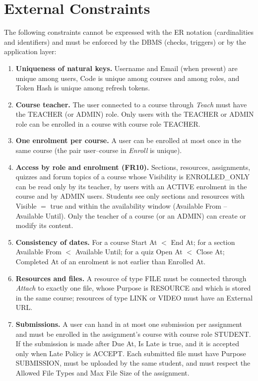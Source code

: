 \section{External Constraints}
The following constraints cannot be expressed with the ER notation (cardinalities and identifiers) and must be enforced by the DBMS (checks, triggers) or by the application layer:
\begin{enumerate}
    \item \textbf{Uniqueness of natural keys.} Username and Email (when present) are unique among users, Code is unique among courses and among roles, and Token Hash is unique among refresh tokens.

    \item \textbf{Course teacher.} The user connected to a course through \textit{Teach} must have the TEACHER (or ADMIN) role. Only users with the TEACHER or ADMIN role can be enrolled in a course with course role TEACHER.

    \item \textbf{One enrolment per course.} A user can be enrolled at most once in the same course (the pair user--course in \textit{Enroll} is unique).

    \item \textbf{Access by role and enrolment (FR10).} Sections, resources, assignments, quizzes and forum topics of a course whose Visibility is ENROLLED\_ONLY can be read only by its teacher, by users with an ACTIVE enrolment in the course and by ADMIN users. Students see only sections and resources with Visible $=$ true and within the availability window (Available From -- Available Until). Only the teacher of a course (or an ADMIN) can create or modify its content.

    \item \textbf{Consistency of dates.} For a course Start At $<$ End At; for a section Available From $<$ Available Until; for a quiz Open At $<$ Close At; Completed At of an enrolment is not earlier than Enrolled At.

    \item \textbf{Resources and files.} A resource of type FILE must be connected through \textit{Attach} to exactly one file, whose Purpose is RESOURCE and which is stored in the same course; resources of type LINK or VIDEO must have an External URL.

    \item \textbf{Submissions.} A user can hand in at most one submission per assignment and must be enrolled in the assignment's course with course role STUDENT. If the submission is made after Due At, Is Late is true, and it is accepted only when Late Policy is ACCEPT. Each submitted file must have Purpose SUBMISSION, must be uploaded by the same student, and must respect the Allowed File Types and Max File Size of the assignment.


\end{enumerate}
